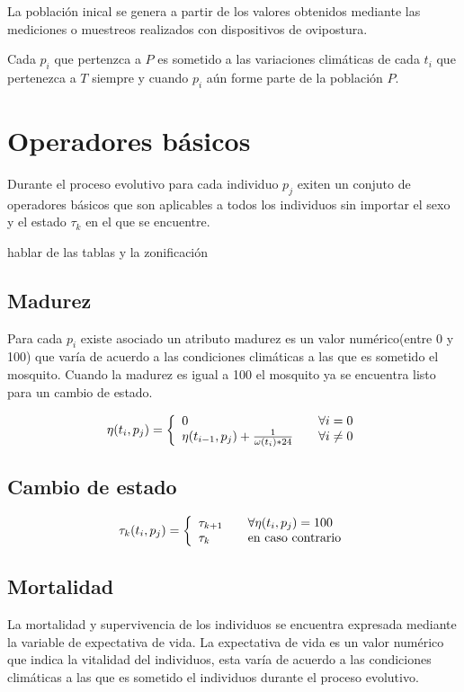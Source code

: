La población inical se genera a partir de los valores obtenidos mediante
las mediciones o muestreos realizados con dispositivos de ovipostura.

Cada $p_{i}$ que pertenzca a $P$ es sometido a las variaciones climáticas de
cada $t_{i}$ que pertenezca a $T$ siempre y cuando $p_{i}$ aún forme parte
de la población $P$.

\section{Operadores básicos}
Durante el proceso evolutivo para cada individuo $p_{j}$ exiten un conjuto
de operadores básicos que son aplicables a todos los individuos sin importar
el sexo y el estado $\tau_{k}$ en el que se encuentre.

hablar de las tablas y la zonificación


\subsection{Madurez}
Para cada $p_{i}$ existe asociado un atributo madurez  es
un valor numérico(entre 0 y 100) que varía de acuerdo a las condiciones
climáticas a las que es sometido el mosquito. Cuando la madurez es igual
a 100 el mosquito ya se encuentra listo para un cambio de estado.

\begin{equation}
\eta (t_{i}, p_{j}) = \left\{
  \begin{array}{l l}
    0 & \quad \forall i = 0 \\
    \eta (t_{i-1}, p_{j}) + \frac{1}{\omega(t_{i}) * 24} & \quad \forall i \neq 0
  \end{array} \right.
\end{equation}

\subsection{Cambio de estado}

\begin{equation}
\tau_{k} (t_{i}, p_{j}) = \left\{
  \begin{array}{l l}
    \tau_{k+1} & \quad \forall  \eta(t_{i}, p_{j}) = 100 \\
    \tau_{k} & \quad \text{en caso contrario}
  \end{array} \right.
\end{equation}


\subsection{Mortalidad}
La mortalidad y supervivencia de los individuos se encuentra expresada
mediante la variable de expectativa de vida. La expectativa de vida es
un valor numérico que indica la vitalidad del individuos, esta varía de
acuerdo a las condiciones climáticas a las que es sometido el individuos
durante el proceso evolutivo.

